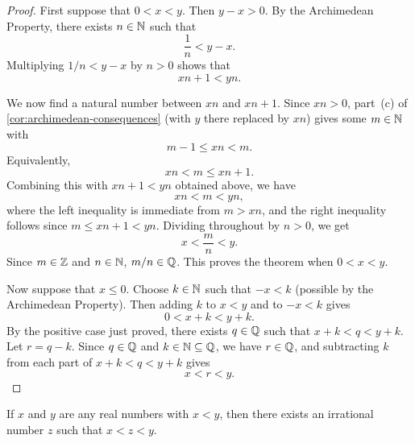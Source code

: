 \begin{proof}
    First suppose that $0<x<y$. Then $y-x>0$. By the Archimedean Property, there exists $n\in\mathbb{N}$ such that
    \begin{equation*}
        \frac1n<y-x.
    \end{equation*}
    Multiplying $1/n<y-x$ by $n>0$ shows that
    \begin{equation*}
        xn+1<yn.
    \end{equation*}

    We now find a natural number between $xn$ and $xn+1$. Since $xn>0$, part~(c) of \cref{cor:archimedean-consequences} (with $y$ there replaced by $xn$) gives some $m\in\mathbb{N}$ with
    \begin{equation*}
        m-1\leq xn<m.
    \end{equation*}
    Equivalently,
    \begin{equation*}
        xn<m\leq xn+1.
    \end{equation*}
    Combining this with $xn+1<yn$ obtained above, we have
    \begin{equation*}
        xn<m<yn,
    \end{equation*}
    where the left inequality is immediate from $m>xn$, and the right inequality follows since $m\leq xn+1<yn$. Dividing throughout by $n>0$, we get
    \begin{equation*}
        x<\frac{m}{n}<y.
    \end{equation*}
    Since $m\in\mathbb{Z}$ and $n\in\mathbb{N}$, $m/n\in\mathbb{Q}$. This proves the theorem when $0<x<y$.

    Now suppose that $x\leq0$. Choose $k\in\mathbb{N}$ such that $-x<k$ (possible by the Archimedean Property). Then adding $k$ to $x<y$ and to $-x<k$ gives
    \begin{equation*}
        0<x+k<y+k.
    \end{equation*}
    By the positive case just proved, there exists $q\in\mathbb{Q}$ such that $x+k<q<y+k$. Let $r=q-k$. Since $q\in\mathbb{Q}$ and $k\in\mathbb{N}\subseteq\mathbb{Q}$, we have $r\in\mathbb{Q}$, and subtracting $k$ from each part of $x+k<q<y+k$ gives
    \begin{equation*}
        x<r<y.
    \end{equation*}
\end{proof}

\begin{corollary}\label{cor:density-irrationals}
    If $x$ and $y$ are any real numbers with $x < y$, then there exists an irrational number $z$ such that $x < z < y$.
\end{corollary}

